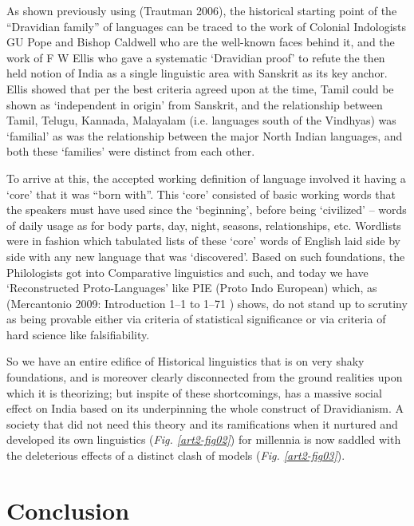 As shown previously using (Trautman 2006), the historical starting point of the “Dravidian family” of languages can be traced to the work of Colonial Indologists GU Pope and Bishop Caldwell who are the well-known faces behind it, and the work of F W Ellis who gave a systematic ‘Dravidian proof’ to refute the then held notion of India as a single linguistic area with Sanskrit as its key anchor. Ellis showed that per the best criteria agreed upon at the time, Tamil could be shown as ‘independent in origin’ from Sanskrit, and the relationship between Tamil, Telugu, Kannada, Malayalam (i.e. languages south of the Vindhyas) was ‘familial’ as was the relationship between the major North Indian languages, and both these ‘families’ were distinct from each other.

To arrive at this, the accepted working definition of language involved it having a ‘core’ that it was “born with”. This ‘core’ consisted of basic working words that the speakers must have used since the ‘beginning’, before being ‘civilized’ – words of daily usage as for body parts, day, night, seasons, relationships, etc. Wordlists were in fashion which tabulated lists of these ‘core’ words of English laid side by side with any new language that was ‘discovered’. Based on such foundations, the Philologists got into Comparative linguistics and such, and today we have ‘Reconstructed Proto-Languages’ like PIE (Proto Indo European) which, as (Mercantonio 2009: Introduction 1–1 to 1–71 ) shows, do not stand up to scrutiny as being provable either via criteria of statistical significance or via criteria of hard science like falsifiability.

So we have an entire edifice of Historical linguistics that is on very shaky foundations, and is moreover clearly disconnected from the ground realities upon which it is theorizing; but inspite of these shortcomings, has a massive social effect on India based on its underpinning the whole construct of Dravidianism. A society that did not need this theory and its ramifications when it nurtured and developed its own linguistics (\textit{Fig. \ref{art2-fig02}}) for millennia is now saddled with the deleterious effects of a distinct clash of models (\textit{Fig. \ref{art2-fig03}}).



\section*{Conclusion}

